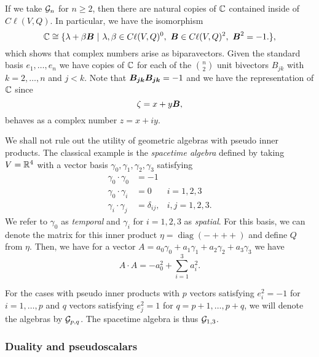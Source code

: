 \begin{remark}
If we take $\mathcal{G}_n$ for $n\geq 2$, then there are natural copies of $\mathbb{C}$ contained inside of $C\ell(V,Q)$. In particular, we have the isomorphism
    \[
        \mathbb{C} \cong \{\lambda + \beta \boldsymbol{B} ~\vert~ \lambda,\beta \in C\ell(V,Q)^0,~ \boldsymbol{B} \in C\ell(V,Q)^2,~ \boldsymbol{B}^2=-1. \},
    \]
   which shows that complex numbers arise as biparavectors. Given the standard basis $e_1,\dots,e_n$ we have copies of $\mathbb{C}$ for each of the ${ n \choose 2}$ unit bivectors $B_{jk}$ with $k=2,\dots,n$ and $j<k$. Note that $\boldsymbol{B_{jk}}\boldsymbol{B_{jk}}=-1$ and we have the representation of $\mathbb{C}$ since
    \[
        \zeta = x + y\boldsymbol{B},
    \]
    behaves as a complex number $z=x+iy$.
\end{remark}

\begin{example}
\label{ex:spacetime_algebra}
We shall not rule out the utility of geometric algebras with pseudo inner products. The classical example is the \emph{spacetime algebra} defined by taking $V=\mathbb{R}^4$ with a vector basis $\gamma_0,\gamma_1,\gamma_2,\gamma_3$ satisfying
\begin{subequations}
\begin{align}
\gamma_0 \cdot \gamma_0 &= -1\\
\gamma_0 \cdot \gamma_i &= 0  &i=1,2,3\\
\gamma_i \cdot \gamma_j &= \delta_{ij}, &i,j=1,2,3.
\end{align}
\end{subequations}
We refer to $\gamma_0$ as \emph{temporal} and $\gamma_i$ for $i=1,2,3$ as \emph{spatial}. For this basis, we can denote the matrix for this inner product $\eta =\operatorname{diag}(-+++)$ and define $Q$ from $\eta$. Then, we have for a vector $A = a_0 \gamma_0 +a_1 \gamma_1 + a_2 \gamma_2 + a_3 \gamma_3$ we have
\[
A\cdot A = -a_0^2 + \sum_{i=1}^3 a_i^2.
\]
\end{example}

\begin{remark}
For the cases with pseudo inner products with $p$ vectors satisfying $e_i^2 = -1$ for $i=1,\dots, p$ and $q$ vectors satisfying $e_j^2=1$ for $q=p+1,\dots,p+q$, we will denote the algebras by $\mathcal{G}_{p,q}$. The spacetime algebra is thus $\mathcal{G}_{1,3}$. 
\end{remark}

\subsubsection{Duality and pseudoscalars}
\label{subsection:duality_and_pseudoscalars}

